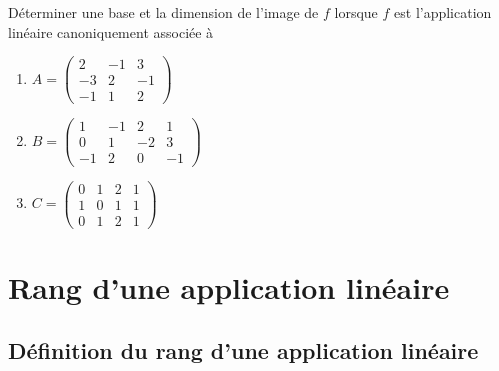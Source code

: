 \documentclass[a4paper, 11pt]{article}
\begin{document}
{\footnotesize \begin{exercice}
D\'eterminer une base et la dimension de l'image de $f$ lorsque $f$ est l'application lin\'eaire  canoniquement associ\'ee \`a
\begin{enumerate}

\item $A=\left( \begin{array}{rrr} 2&-1&3\\-3&2&-1\\-1&1&2   \end{array}\right)$
 

\item $B=\left( \begin{array}{rrrr} 1&-1&2&1\\0&1&-2&3\\-1&2&0&-1   \end{array}\right)$
 

\item $C=\left(\begin{array}{rrrr} 0&1&2&1\\ 1&0&1&1\\ 0&1&2&1  \end{array}\right)$
 
\end{enumerate}
\end{exercice}
}


 

\section{Rang d'une application lin\'eaire}

\subsection{D\'efinition du rang d'une application lin\'eaire}
\end{document}

